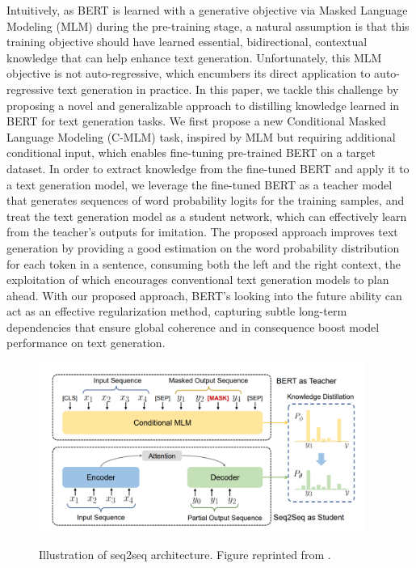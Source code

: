 Intuitively, as BERT is learned with a generative objective via Masked Language Modeling (MLM) during the pre-training stage, a natural assumption is that this training objective should have learned essential, bidirectional, contextual knowledge that can help enhance text generation. Unfortunately, this MLM objective is not auto-regressive, which encumbers its direct application to auto-regressive text generation in practice. In this paper, we tackle this challenge by proposing a novel and generalizable approach to distilling knowledge learned in BERT for text generation tasks. We first propose a new Conditional Masked Language Modeling (C-MLM) task, inspired by MLM but requiring additional conditional input, which enables fine-tuning pre-trained BERT on a target dataset. In order to extract knowledge from the fine-tuned BERT and apply it to a text generation model, we leverage the fine-tuned BERT as a teacher model that generates sequences of word probability logits for the training samples, and treat the text generation model as a student network, which can effectively learn from the teacher's outputs for imitation. The proposed approach improves text generation by providing a good estimation on the word probability distribution for each token in a sentence, consuming both the left and the right context, the exploitation of which encourages conventional text generation models to plan ahead. With our proposed approach, BERT's looking into the future ability can act as an effective regularization method, capturing subtle long-term dependencies that ensure global coherence and in consequence boost model performance on text generation.

\cite{chen2019distilling}

\begin{figure}[h]
    {\includegraphics[width=0.95\textwidth]{img/bert_distill.png}}
    \centering
    \caption{Illustration of seq2seq architecture. Figure reprinted from \cite{chen2019distilling}.}
    \label{img:bert_distill}
\end{figure}

